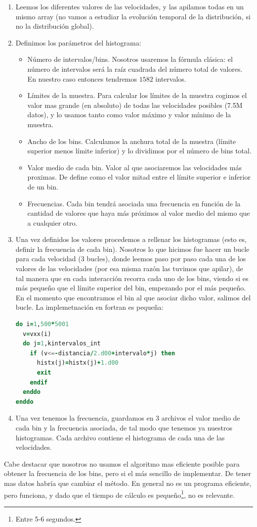 \documentclass[11pt]{article} %
\begin{document}
\begin{enumerate}
	\item Leemos los diferentes valores de las velocidades, y las apilamos todas en un mismo array (no vamos a estudiar la evolución temporal de la distribución, si no la distribución global). 
	\item Definimos los parámetros del histograma:
	\begin{itemize}
		\item Número de intervalos/bins. Nosotros usaremos la fórmula clásica: el número de intervalos será la raíz cuadrada del número total de valores. En nuestro caso entonces tendremos $1582$ intervalos. 
		\item Límites de la muestra. Para calcular los límites de la muestra cogimos el valor mas grande (en absoluto) de todas las velocidades posibles (7.5M datos), y lo usamos tanto como valor máximo y valor mínimo de la muestra.
		\item Ancho de los bins. Calculamos la anchura total de la muestra (límite superior menos límite inferior) y lo dividimos por el número de bins total.
		\item Valor medio de cada bin. Valor al que asociaremos las velocidades más proximas. De define como el valor mitad entre el límite superior e inferior de un bin. 
		\item Frecuencias. Cada bin tendrá asociada una frecuencia en función de la cantidad de valores que haya más próximos al valor medio del mismo que a cualquier otro.
	\end{itemize}
	\item Una vez definidos los valores procedemos a rellenar los histogramas (esto es, definir la frecuencia de cada bin). Nosotros lo que hicimos fue hacer un bucle para cada velocidad (3 bucles), donde leemos paso por paso cada una de los valores de las velocidades (por esa misma razón las tuvimos que apilar), de tal manera que en cada interacción recorra cada uno de los bins, viendo si es más pequeño que el límite superior del bin, empezando por el más pequeño. En el momento que encontramos el bin al que asociar dicho valor, salimos del bucle. La implemetnación en fortran es pequeña:
\begin{lstlisting}[language=Fortran]
do i=1,500*5001
  v=vxx(i)   
  do j=1,kintervalos_int
	if (v<=-distancia/2.d00+intervalo*j) then
	  histx(j)=histx(j)+1.d00
	  exit
	endif   
  enddo     
enddo
\end{lstlisting}
	\item Una vez tenemos la frecuencia, guardamos en 3 archivos el valor medio de cada bin y la frecuencia asociada, de tal modo que tenemos ya nuestros histogramas. Cada archivo contiene el histograma de cada una de las velocidades.
	
\end{enumerate}
Cabe destacar que nosotros no usamos el algoritmo mas eficiente posible para obtener la frecuencia de los bins, pero si el más sencillo de implementar. De tener mas datos habría que cambiar el método. En general no es un programa eficiente, pero funciona, y dado que el tiempo de cálculo es pequeño\footnote{Entre 5-6 segundos.}, no es relevante.
\end{document}
